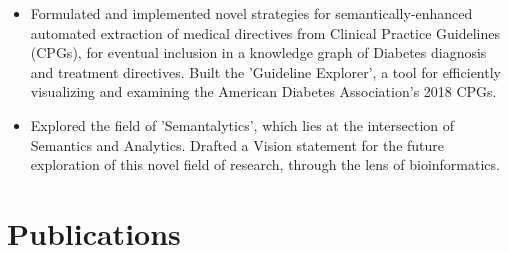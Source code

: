 \documentclass[10pt]{article}
\newcommand{\tabularxwidth}{\textwidth}
\begin{document}
\begin{minipage}{\tabularxwidth}
\begin{itemize}[noitemsep, topsep=3pt, parsep=0pt, partopsep=0pt]
                \item 
    Formulated and implemented novel strategies for semantically-enhanced automated extraction of medical directives from Clinical Practice Guidelines (CPGs), for eventual inclusion in a knowledge graph of Diabetes diagnosis and treatment directives. Built the 'Guideline Explorer', a tool for efficiently visualizing and examining the American Diabetes Association's 2018 CPGs.
            
                \item 
    Explored the field of 'Semantalytics', which lies at the intersection of Semantics and Analytics. Drafted a Vision statement for the future exploration of this novel field of research, through the lens of bioinformatics.
            
        \end{itemize}

        

    \end{minipage}
    

    \vspace{-0.5em}


    
        \section{Publications}
        \vspace{-.5em}
\end{document}
